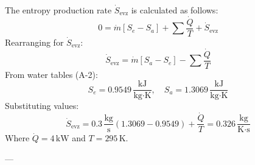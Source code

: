 The entropy production rate \( \dot{S}_{\text{evz}} \) is calculated as follows:  
\[
0 = \dot{m}[S_e - S_a] + \sum \frac{\dot{Q}}{T} + \dot{S}_{\text{evz}}
\]  
Rearranging for \( \dot{S}_{\text{evz}} \):  
\[
\dot{S}_{\text{evz}} = \dot{m}[S_a - S_e] - \sum \frac{\dot{Q}}{T}
\]  
From water tables (A-2):  
\[
S_e = 0.9549 \, \frac{\text{kJ}}{\text{kg·K}}, \quad S_a = 1.3069 \, \frac{\text{kJ}}{\text{kg·K}}
\]  
Substituting values:  
\[
\dot{S}_{\text{evz}} = 0.3 \, \frac{\text{kg}}{\text{s}} \left( 1.3069 - 0.9549 \right) + \frac{\dot{Q}}{T} = 0.326 \, \frac{\text{kg}}{\text{K·s}}
\]  
Where \( \dot{Q} = 4 \, \text{kW} \) and \( T = 295 \, \text{K} \).

---